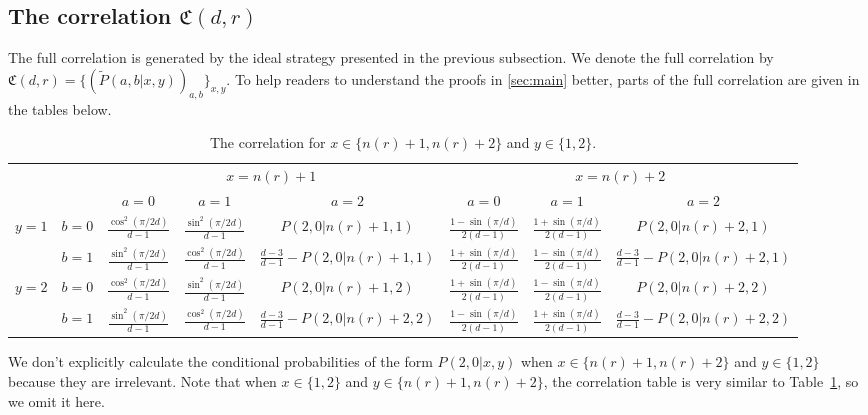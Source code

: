 \documentclass[11pt,letterpaper]{article}
\newcommand{\1}{\mathbb{1}}
\newcommand{\nr}{n(r)}
\newcommand{\fC}{\mathfrak{C}}
\newcommand{\pr}[2]{P(#1|#2)}
\newcommand{\tpr}[2]{\tilde{P}(#1|#2)}
\theoremstyle{definition}
\begin{document}
\subsection{The correlation $\fC(d,r)$}
\label{sec:cor}
The full correlation is generated by the ideal strategy presented in the previous subsection.
We denote the full correlation by $\fC(d,r) = \{( \tpr{a,b}{x,y} )_{a,b}\}_{x,y}$.
To help readers to understand the proofs in \cref{sec:main} better, 
parts of the full correlation are given in the tables below.


\begin{table}[H]
\begin{center}
\begin{tabular}{|c|c||c|c|c|c|c|c|}
\hline
\multicolumn{2}{|c|}{} &
\multicolumn{3}{|c|}{$x=\nr+1$}&
\multicolumn{3}{|c|}{$x=\nr+2$} \\
\cline{3-8}
\multicolumn{2}{|c|}{} &
$a = 0$ & $a=1$ & $a=2$ &
$a = 0$ & $a=1$ & $a=2$\\
\hline
\hline
\multirow{2}{*}{$y = 1$} & $b=0$ & $\frac{\cos^2(\pi/2d)}{d-1}$ & $\frac{\sin^2(\pi/2d)}{d-1}$ & \small $\pr{2,0}{\nr+1,1}$ 
& $\frac{1-\sin(\pi/d)}{2(d-1)}$ & $\frac{1+\sin(\pi/d)}{2(d-1)}$ & \small  $\pr{2,0}{\nr+2,1}$ \\
\cline{2-8}
&$b=1$ & $\frac{\sin^2(\pi/2d)}{d-1}$ & $\frac{\cos^2(\pi/2d)}{d-1}$ & $\frac{d-3}{d-1}-\pr{2,0}{\nr+1,1}$ 
&  $\frac{1+\sin(\pi/d)}{2(d-1)}$ & $\frac{1-\sin(\pi/d)}{2(d-1)}$ & \small $\frac{d-3}{d-1} - \pr{2,0}{\nr+2,1}$  \\
\hline
\multirow{2}{*}{$y = 2$} & $b=0$ & $\frac{\cos^2(\pi/2d)}{d-1}$ & $\frac{\sin^2(\pi/2d)}{d-1}$ & \small $\pr{2,0}{\nr+1,2}$ & 
$ \frac{1+\sin(\pi/d)}{2(d-1)}$ & $ \frac{1-\sin(\pi/d)}{2(d-1)}$ & \small $\pr{2, 0}{\nr+2,2}$  \\
\cline{2-8}
&$b=1$ & $\frac{\sin^2(\pi/2d)}{d-1}$ & $\frac{\cos^2(\pi/2d)}{d-1}$ & \small $\frac{d-3}{d-1}-\pr{2,0}{\nr+2,2}$ &  
$ \frac{1-\sin(\pi/d)}{2(d-1)}$ & $ \frac{1+\sin(\pi/d)}{2(d-1)}$ & \small $\frac{d-3}{d-1}- \pr{2,0}{\nr+2,2}$ \\
\hline
\end{tabular}
\end{center}
\caption{The correlation for $x \in \{\nr+1, \nr+2\}$ and $y \in \{1,2\}$.}
\label{tb:chsh}
\end{table}
We don't explicitly calculate the conditional probabilities of the form $\pr{2,0}{x,y}$ when $x \in \{\nr+1, \nr+2\}$ and $y \in \{1, 2\}$ 
because they are irrelevant.
Note that when $x \in \{1,2\}$ and $y \in \{\nr+1, \nr+2\}$, the correlation table is 
very similar to Table~\ref{tb:chsh}, so we omit it here.
\end{document}
